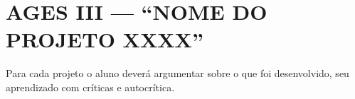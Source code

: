 \chapter[AGES III --- “NOME DO PROJETO XXXX”]{AGES III --- “NOME DO PROJETO XXXX”}

Para cada projeto o aluno deverá argumentar sobre o que foi desenvolvido,
seu aprendizado com críticas e autocrítica.




